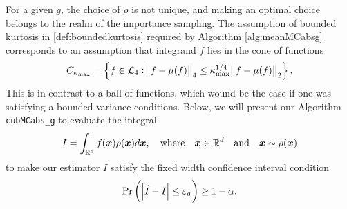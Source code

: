 \documentclass{iitthesis}
\begin{document}
For a given $g$, the choice of $\rho$ is not unique, and making an optimal choice belongs to the realm of the importance sampling. The assumption of bounded kurtosis in \eqref{def:boundedkurtosis} required by Algorithm \ref{alg:meanMCabsg} corresponds to an assumption that integrand $f$ lies in the cone of functions \cite{CDHHZ13}
\begin{align}
C_{\kappa_{\max}} = \left\{ f \in \mathcal{L}_4: \norm{f-\mu(f)}_4 \leq \kappa_{\max}^{1/4} \norm{f-\mu(f)}_2\right\}.
\end{align}
This is in contrast to a ball of functions, which wound be the case if one was satisfying a bounded variance conditions.
Below, we will present our Algorithm {\tt cubMCabs\_g} to evaluate the integral
$$I = \int_{\mathbb{R}^d} f(\boldsymbol{x})\rho(\boldsymbol{x})d\boldsymbol{x}, \quad \text{where}\quad \boldsymbol{x} \in \mathbb{R}^d \quad \text{and}\quad  \boldsymbol{x} \sim \rho(\boldsymbol{x})$$
to make our estimator $\hat{I}$ satisfy the fixed width confidence interval condition
\begin{align}\label{cubMCabsgCI}
\Pr \left(\left \lvert \hat{I}-I \right \rvert \leq \varepsilon_a \right) \geq 1-\alpha.
\end{align}

\label{sec:cubMCabsg}
\end{document}

